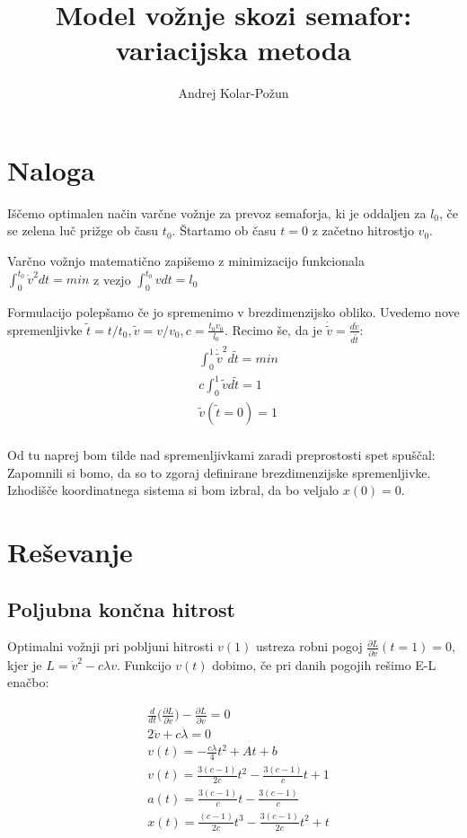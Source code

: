 \documentclass{article}
\title{Model vo{\v z}nje skozi semafor: variacijska metoda}
\author{Andrej Kolar-Po{\v z}un}
\begin{document}
\maketitle
\newpage
{}

\section{Naloga}
Iščemo optimalen način varčne vožnje za prevoz semaforja, ki je oddaljen za $l_0$, če se zelena luč prižge ob času $t_0$. Štartamo ob času $t=0$ z začetno hitrostjo $v_0$.

Varčno vožnjo matematično zapišemo z minimizacijo funkcionala 
\\
$\int_0^{t_0} \dot{v}^2 dt = min$ z vezjo $\int_0^{t_0} v dt = l_0$ 

Formulacijo polepšamo če jo spremenimo v brezdimenzijsko obliko. Uvedemo nove spremenljivke $\tilde{t}=t/t_0, \tilde{v}=v/v_0, c=\frac{t_0 v_0}{l_0}$. Recimo še, da je $\dot{\tilde{v}} = \frac{d\tilde{v}}{d\tilde{t}}$:
\begin{align*}
&\int_0^1 \dot{\tilde{v}}^2 d\tilde{t} =  min \\
&c \int_0^1 \tilde{v} d\tilde{t} = 1 \\
&\tilde{v}(\tilde{t}=0) = 1 \\
\end{align*}

Od tu naprej bom tilde nad spremenljivkami zaradi preprostosti spet spuščal: Zapomnili si bomo, da so to zgoraj definirane brezdimenzijske spremenljivke. Izhodišče koordinatnega sistema si bom izbral, da bo veljalo $x(0)=0$.

\section{Reševanje}
\subsection{Poljubna končna hitrost}
Optimalni vožnji pri pobljuni hitrosti $v(1)$ ustreza robni pogoj $\frac{\partial{L}}{\partial{\dot{v}}}(t=1) = 0$, kjer je 
$L= \dot{v}^2 - c \lambda v$. Funkcijo $v(t)$ dobimo, če pri danih pogojih rešimo E-L enačbo:

\begin{align*}
&\frac{d}{dt}\Big(\frac{\partial{L}}{\partial{\dot{v}}}\Big) - \frac{\partial{L}}{\partial{v}} = 0 \\
&2\ddot{v} +  c \lambda = 0 \\
&v(t) = -\frac{c \lambda}{4} t^2 + At + b \\
&v(t) = \frac{3(c-1)}{2c} t^2 - \frac{3(c-1)}{c}t + 1 \\ 
&a(t) = \frac{3(c-1)}{c}t - \frac{3(c-1)}{c} \\
&x(t) =\frac{(c-1)}{2c} t^3 - \frac{3(c-1)}{2c}t^2 + t
\end{align*}
\end{document}
